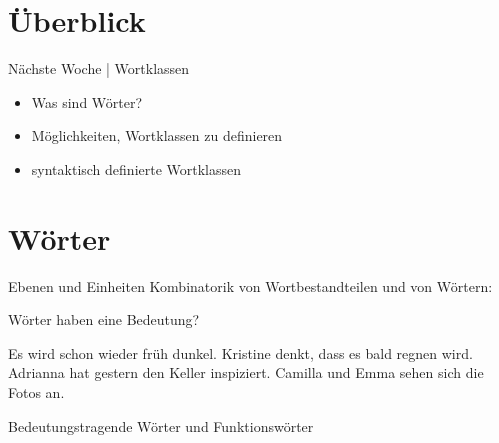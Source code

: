 \section{Überblick}

\begin{frame}
  {Nächste Woche | Wortklassen}
  \onslide<+->
  \begin{itemize}[<+->]
    \item Was sind Wörter?
      \Halbzeile 
    \item Möglichkeiten, Wortklassen zu definieren
      \Halbzeile
    \item syntaktisch definierte Wortklassen
  \end{itemize}
\end{frame}

\section{Wörter}


\begin{frame}
  {Ebenen und Einheiten}
  \pause
  Kombinatorik von Wortbestandteilen und von Wörtern:
  \pause
  \Zeile
  \begin{exe}
    \ex
    \begin{xlist}
      \pause
    \end{xlist}
    \pause
    \Zeile
    \ex
    \begin{xlist}
      \pause
    \end{xlist}
  \end{exe}
\end{frame}

\begin{frame}
  {Wörter haben eine Bedeutung?}
  \pause
  \begin{exe}
    \ex \alert{Es} \alert{wird} schon wieder früh dunkel.
    \pause
    \ex Kristine denkt, \alert{dass} \alert{es} bald regnen \alert{wird}.
    \pause
    \ex Adrianna \alert{hat} gestern \alert{den} Keller inspiziert.
    \pause
    \ex Camilla \alert{und} Emma sehen \alert{sich} \alert{die} Fotos \alert{an}.
  \end{exe}
  \Zeile
  \pause
  \large
  Bedeutungstragende Wörter und \alert{Funktionswörter}
\end{frame}

